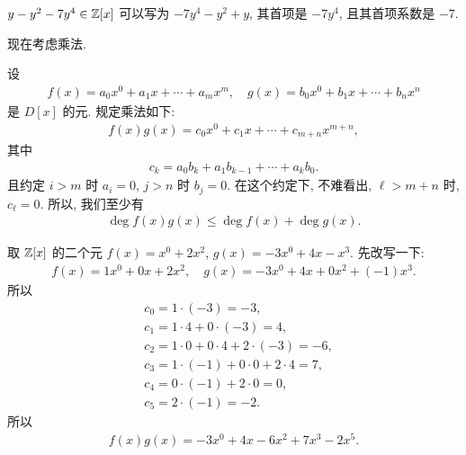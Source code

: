 \begin{example}
    $y - y^2 - 7y^4 \in \mathbb{Z}[x]$ 可以写为 $-7y^4 - y^2 + y$, 其首项是 $-7y^4$, 且其首项系数是 $-7$.
\end{example}

现在考虑乘法.

\begin{definition}
    设
    \begin{align*}
        f(x) = a_0 x^0 + a_1 x + \cdots + a_m x^m, \quad g(x) = b_0 x^0 + b_1 x + \cdots + b_n x^n
    \end{align*}
    是 $D[x]$ 的元. 规定乘法如下:
    \begin{align*}
        f(x) g(x) = c_0 x^0 + c_1 x + \cdots + c_{m+n} x^{m+n},
    \end{align*}
    其中
    \begin{align*}
        c_k = a_0 b_k + a_1 b_{k-1} + \cdots + a_k b_0.
    \end{align*}
    且约定 $i > m$ 时 $a_i = 0$, $j > n$ 时 $b_j = 0$. 在这个约定下, 不难看出, $\ell > m+n$ 时, $c_\ell = 0$. 所以, 我们至少有
    \begin{align*}
        \deg f(x)g(x) \leq \deg f(x) + \deg g(x).
    \end{align*}
\end{definition}

\begin{example}
    取 $\mathbb{Z}[x]$ 的二个元 $f(x)=x^0 + 2x^2$, $g(x)=-3x^0 + 4x - x^3$. 先改写一下:
    \begin{align*}
        f(x) = 1x^0 + 0x + 2x^2, \quad g(x) = -3x^0 + 4x + 0x^2 + (-1)x^3.
    \end{align*}
    所以
    \begin{align*}
         & c_0 = 1 \cdot (-3) = -3,                         \\
         & c_1 = 1 \cdot 4 + 0 \cdot (-3) = 4,              \\
         & c_2 = 1 \cdot 0 + 0 \cdot 4 + 2 \cdot (-3) = -6, \\
         & c_3 = 1 \cdot (-1) + 0 \cdot 0 + 2 \cdot 4 = 7,  \\
         & c_4 = 0 \cdot (-1) + 2 \cdot 0 = 0,              \\
         & c_5 = 2 \cdot (-1) = -2.
    \end{align*}
    所以
    \begin{align*}
        f(x) g(x) = -3x^0 + 4x - 6x^2 + 7x^3 - 2x^5.
    \end{align*}
\end{example}

